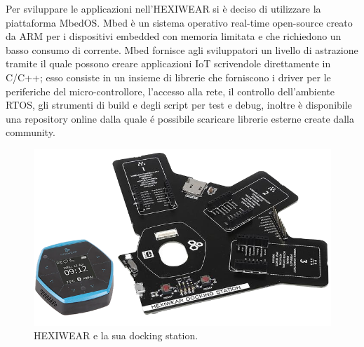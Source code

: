 Per sviluppare le applicazioni nell'HEXIWEAR si è deciso di utilizzare la piattaforma MbedOS. Mbed è un sistema operativo real-time open-source creato da ARM per i dispositivi embedded con memoria limitata e che richiedono un basso consumo di corrente. 
Mbed fornisce agli sviluppatori un livello di astrazione tramite il quale possono creare applicazioni IoT scrivendole direttamente in C/C++; esso consiste in un insieme di librerie che forniscono i driver per le periferiche del micro-controllore, l'accesso alla rete, il controllo dell'ambiente RTOS, gli strumenti di build e degli script per test e debug, inoltre è disponibile una repository online dalla quale é possibile scaricare librerie esterne create dalla community.

\begin{figure}[!htb]
    \centering
    \includegraphics[width=.8\textwidth]{figure/hexiwear.png}
    \caption{HEXIWEAR e la sua docking station.}
    \label{fig:hexiwear}
\end{figure}